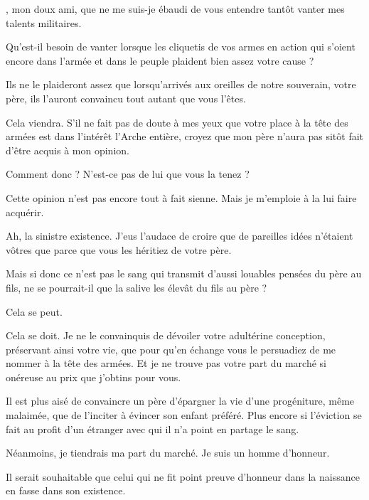 \begin{drama}
  \generalspeaks \elena, mon doux ami, que ne me suis-je ébaudi de vous entendre tantôt vanter mes talents militaires.

  \elenaspeaks Qu’est-il besoin de vanter lorsque les cliquetis de vos armes en action qui s’oient encore dans l’armée et dans le peuple plaident bien assez votre cause ?

  \generalspeaks Ils  ne le plaideront assez que lorsqu’arrivés aux oreilles de notre souverain, votre père, ils l’auront convaincu tout autant que vous l’êtes.

  \elenaspeaks Cela viendra. S’il ne fait pas de doute à mes yeux que votre place à la tête des armées est dans l’intérêt l’Arche entière, croyez que mon père n’aura pas sitôt fait d’être acquis à mon opinion.

  \generalspeaks Comment donc ? N’est-ce pas de lui que vous la tenez ?


  \elenaspeaks Cette opinion n’est pas encore tout à fait sienne. Mais je m’emploie à la lui faire acquérir.

  \generalspeaks 
  Ah, la sinistre existence. J’eus l’audace de croire que de pareilles idées n’étaient vôtres que parce que vous les héritiez de votre père.

  Mais si donc ce n’est pas le sang qui transmit d’aussi louables pensées du père au fils, ne se pourrait-il que la salive les élevât du fils au père ?

  \elenaspeaks Cela se peut.

  \generalspeaks Cela se doit. Je ne le convainquis de dévoiler votre adultérine conception, préservant ainsi votre vie, que pour qu’en échange vous le persuadiez de me nommer à la tête des armées. Et je ne trouve pas votre part du marché si onéreuse au prix que j’obtins pour vous.

  \elenaspeaks
  Il est plus aisé de convaincre un père d’épargner la vie d’une progéniture, même malaimée, que de l’inciter à évincer son enfant préféré. Plus encore si l’éviction se fait au profit d’un étranger avec qui il n’a point en partage le sang.

  Néanmoins, je tiendrais ma part du marché. Je suis un homme d’honneur.

  \generalspeaks Il serait souhaitable que celui qui ne fit point preuve d’honneur dans la naissance en fasse dans son existence.

\end{drama}

